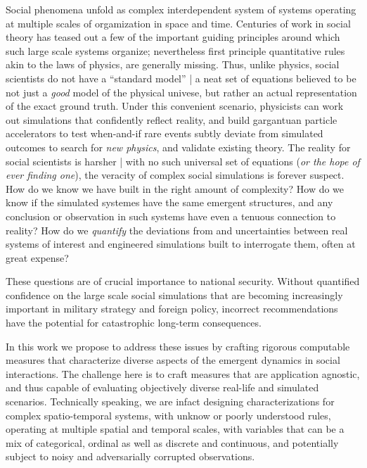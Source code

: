 \documentclass[onecolumn, compsoc,11pt]{IEEEtran}
\begin{document}
Social phenomena unfold as complex interdependent system of systems operating at multiple scales  of orgamization in space and time. Centuries of work in social theory  has teased out a few of the important  guiding principles around which such large scale  systems organize; nevertheless first principle quantitative rules  akin to the laws of physics, are generally  missing. Thus, unlike physics, social scientists do not have a ``standard model'' | a neat set of equations  believed  to be not just a \textit{good} model of the physical univese, but rather an actual representation of the exact ground truth. Under  this convenient  scenario, physicists  can work out simulations that confidently reflect reality, and build gargantuan particle accelerators to test when-and-if  rare events subtly deviate from simulated outcomes to search for \textit{new physics}, and validate existing theory. The reality for social scientists is harsher | with no such universal set of equations (\textit{or the hope of ever finding one}), the veracity of complex social simulations is forever suspect. How do we know we have built in the right amount of complexity? How do we know if the simulated systemes have the same emergent structures, and any conclusion or observation in such systems have even a tenuous  connection to  reality? How do we \textit{quantify} the deviations from and uncertainties between real systems of interest  and engineered simulations built to interrogate them, often at great expense?


These questions are of crucial importance to national security. Without quantified confidence on the large scale social simulations that are becoming increasingly important in military strategy and foreign policy,  incorrect recommendations have the potential for  catastrophic long-term consequences.


In this work we propose to address these issues by crafting rigorous computable measures  that characterize diverse aspects of the  emergent dynamics in social interactions. The challenge here is to  craft measures that are application agnostic, and thus capable of evaluating  objectively  diverse real-life and simulated scenarios. Technically speaking, we are infact designing characterizations for complex spatio-temporal systems, with unknow or poorly understood rules, operating at multiple spatial and temporal scales, with variables that can be a mix of categorical, ordinal as well as discrete and continuous, and potentially subject to noisy and  adversarially corrupted observations.
\end{document}

